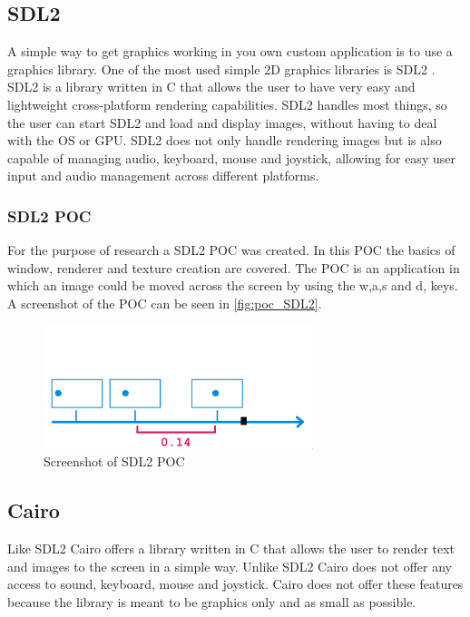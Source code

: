 \documentclass{article} %
\begin{document}
\subsection{SDL2} \label{SDL2}
A simple way to get graphics working in you own custom application is to use a graphics library.
One of the most used simple 2D graphics libraries is SDL2 \cite{sdl2}.
SDL2 is a library written in C that allows the user to have very easy and lightweight cross-platform rendering capabilities.
SDL2 handles most things, so the user can start SDL2 and load and display images, without having to deal with the OS or GPU.
SDL2 does not only handle rendering images but is also capable of managing audio, keyboard, mouse and joystick, allowing for easy user input and audio management across different platforms.

\subsubsection{SDL2 POC}
For the purpose of research a SDL2 POC was created. In this POC the basics of window, renderer and texture creation are covered.
The POC is an application in which an image could be moved across the screen by using the w,a,s and d, keys.
A screenshot of the POC can be seen in \autoref{fig:poc_SDL2}.

\begin{figure}[h!]
	\centering
	\includegraphics[width=0.7\textwidth]{pos_SDL2_screenshot.png}
	\caption{Screenshot of SDL2 POC}
	\label{fig:poc_SDL2}
\end{figure}

\subsection{Cairo}
Like SDL2 Cairo \cite{cairo}  offers a library written in C that allows the user to render text and images to the screen in a simple way.
Unlike SDL2 Cairo does not offer any access to sound, keyboard, mouse and joystick.
Cairo does not offer these features because the library is meant to be graphics only and as small as possible.
\end{document}
